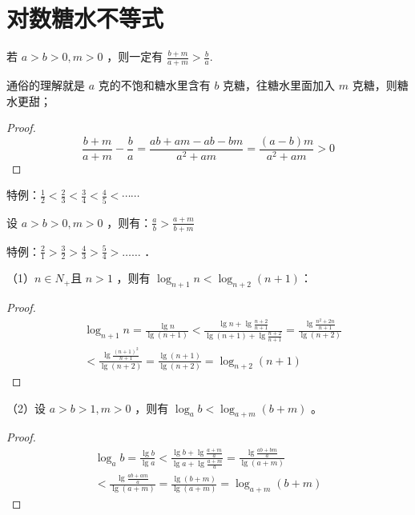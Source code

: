 \section{对数糖水不等式}

\begin{theorem}[糖水不等式]
    若 $a>b>0, m>0$ ，则一定有 $\frac{b+m}{a+m}>\frac{b}{a}$.

    通俗的理解就是 $a$ 克的不饱和糖水里含有 $b$ 克糖，往糖水里面加入 $m$ 克糖，则糖水更甜；

    \begin{proof}
        $$\frac{b+m}{a+m}-\frac{b}{a}=\frac{a b+a m-a b-b m}{a^2+a m}=\frac{(a-b) m}{a^2+a m}>0$$
    \end{proof}
    \begin{warning}
        特例：$\frac{1}{2}<\frac{2}{3}<\frac{3}{4}<\frac{4}{5}<\cdots \cdots$
    \end{warning}
\end{theorem}

\begin{theorem}[倒数形式的糖水不等式]
    设 $a>b>0, m>0$ ，则有：$\frac{a}{b}>\frac{a+m}{b+m}$

    \begin{warning}
        特例：$\frac{2}{1}>\frac{3}{2}>\frac{4}{3}>\frac{5}{4}>\ldots \ldots$ ．
    \end{warning}
\end{theorem}

\begin{theorem}[对数糖水不等式]
    （1）$n \in N_{+}$且 $n>1$ ，则有 $\log _{n+1} n<\log _{n+2}(n+1)$：
    \begin{proof}
        $$
            \begin{aligned}
                 & \log _{n+1} n=\frac{\lg n}{\lg (n+1)}<\frac{\lg n+\lg \frac{n+2}{n+1}}{\lg (n+1)+\lg \frac{n+2}{n+1}}=\frac{\lg \frac{n^2+2 n}{n+1}}{\lg (n+2)} \\
                 & <\frac{\lg \frac{(n+1)^2}{n+1}}{\lg (n+2)}=\frac{\lg (n+1)}{\lg (n+2)}=\log _{n+2}(n+1)
            \end{aligned}
        $$
    \end{proof}

    （2）设 $a>b>1, m>0$ ，则有 $\log _a b<\log _{a+m}(b+m)$ 。

    \begin{proof}

        $$
            \begin{gathered}
                \log _a b=\frac{\lg b}{\lg a}<\frac{\lg b+\lg \frac{a+m}{a}}{\lg a+\lg \frac{a+m}{a}}=\frac{\lg \frac{a b+b m}{a}}{\lg (a+m)} \\
                <\frac{\lg \frac{a b+a m}{a}}{\lg (a+m)}=\frac{\lg (b+m)}{\lg (a+m)}=\log _{a+m}(b+m)
            \end{gathered}
        $$
    \end{proof}
\end{theorem}

